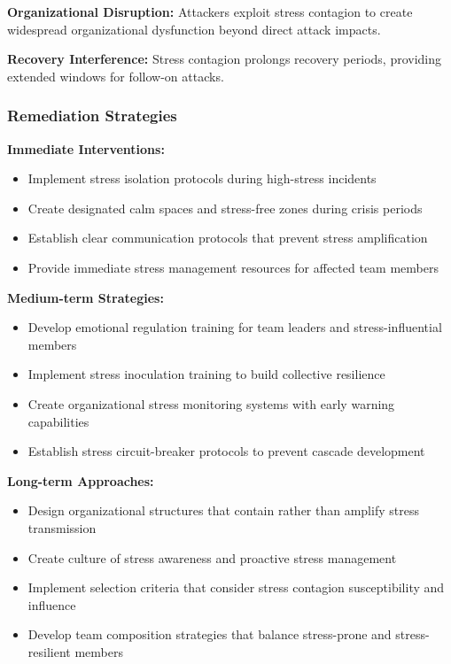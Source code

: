 \documentclass[11pt,a4paper]{article}
\begin{document}
\textbf{Organizational Disruption:} Attackers exploit stress contagion to create widespread organizational dysfunction beyond direct attack impacts\cite{disruption2022}.

\textbf{Recovery Interference:} Stress contagion prolongs recovery periods, providing extended windows for follow-on attacks\cite{recovery2023}.

\subsubsection{Remediation Strategies}

\textbf{Immediate Interventions:}
\begin{itemize}
\item Implement stress isolation protocols during high-stress incidents
\item Create designated calm spaces and stress-free zones during crisis periods
\item Establish clear communication protocols that prevent stress amplification
\item Provide immediate stress management resources for affected team members
\end{itemize}

\textbf{Medium-term Strategies:}
\begin{itemize}
\item Develop emotional regulation training for team leaders and stress-influential members
\item Implement stress inoculation training to build collective resilience
\item Create organizational stress monitoring systems with early warning capabilities
\item Establish stress circuit-breaker protocols to prevent cascade development
\end{itemize}

\textbf{Long-term Approaches:}
\begin{itemize}
\item Design organizational structures that contain rather than amplify stress transmission
\item Create culture of stress awareness and proactive stress management
\item Implement selection criteria that consider stress contagion susceptibility and influence
\item Develop team composition strategies that balance stress-prone and stress-resilient members
\end{itemize}
\end{document}
